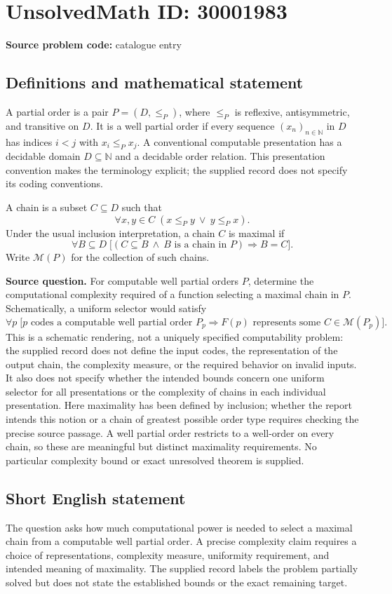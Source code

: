 \documentclass[11pt]{article}
\newcommand{\N}{\mathbb{N}}
\begin{document}
\section*{UnsolvedMath ID: 30001983}
\textbf{Source problem code:} catalogue entry
\subsection{Definitions and mathematical statement}
A partial order is a pair \(P=(D,\leq_P)\), where \(\leq_P\) is reflexive, antisymmetric, and transitive on \(D\). It is a well partial order if every sequence \((x_n)_{n\in\N}\) in \(D\) has indices \(i<j\) with \(x_i\leq_P x_j\). A conventional computable presentation has a decidable domain \(D\subseteq\N\) and a decidable order relation. This presentation convention makes the terminology explicit; the supplied record does not specify its coding conventions.

A chain is a subset \(C\subseteq D\) such that
\[
\forall x,y\in C\; (x\leq_P y\ \lor\ y\leq_P x).
\]
Under the usual inclusion interpretation, a chain \(C\) is maximal if
\[
\forall B\subseteq D\;\bigl[(C\subseteq B\ \land\ B\text{ is a chain in }P)\Longrightarrow B=C\bigr].
\]
Write \(\mathcal M(P)\) for the collection of such chains.

\textbf{Source question.} For computable well partial orders \(P\), determine the computational complexity required of a function selecting a maximal chain in \(P\). Schematically, a uniform selector would satisfy
\[
\forall p\;\bigl[p\text{ codes a computable well partial order }P_p
\Longrightarrow F(p)\text{ represents some }C\in\mathcal M(P_p)\bigr].
\]
This is a schematic rendering, not a uniquely specified computability problem: the supplied record does not define the input codes, the representation of the output chain, the complexity measure, or the required behavior on invalid inputs. It also does not specify whether the intended bounds concern one uniform selector for all presentations or the complexity of chains in each individual presentation. Here maximality has been defined by inclusion; whether the report intends this notion or a chain of greatest possible order type requires checking the precise source passage. A well partial order restricts to a well-order on every chain, so these are meaningful but distinct maximality requirements. No particular complexity bound or exact unresolved theorem is supplied.
\subsection{Short English statement}
The question asks how much computational power is needed to select a maximal chain from a computable well partial order. A precise complexity claim requires a choice of representations, complexity measure, uniformity requirement, and intended meaning of maximality. The supplied record labels the problem partially solved but does not state the established bounds or the exact remaining target.
\end{document}
